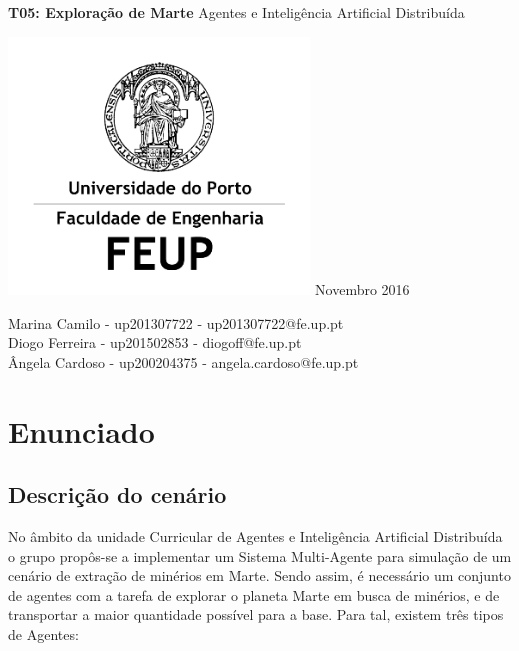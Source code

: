 \documentclass[12pt]{report}
\begin{document}
  \begin{titlepage}
    \begin{center}
        \vspace*{1cm}
        
        \Huge
        \textbf{T05: Exploração de Marte}
        \vspace{0.5cm}
        \LARGE
        Agentes e Inteligência Artificial Distribuída
        
        \vfill
        
	\includegraphics[width=0.6\textwidth]{FEUP_Logo}
	\break
        \small
        Novembro 2016
        
        \vfill
        
	\vspace{1.5cm}
        \normalsize{
	  Marina Camilo - up201307722 - up201307722@fe.up.pt \\
	  Diogo Ferreira - up201502853 - diogoff@fe.up.pt \\
	  Ângela Cardoso - up200204375 - angela.cardoso@fe.up.pt
        }
        
    \end{center}
  \end{titlepage}

\newpage
\tableofcontents

\clearpage
\chapter{Enunciado}

\section{Descrição do cenário}
No âmbito da unidade Curricular de Agentes e Inteligência Artificial Distribuída o grupo propôs-se a implementar um Sistema Multi-Agente para simulação de um cenário de extração de minérios em Marte.
Sendo assim, é necessário um conjunto de agentes com a tarefa de explorar o planeta Marte em busca de minérios, e de transportar a maior quantidade possível para a base. Para tal, existem três tipos de Agentes:
\end{document}
